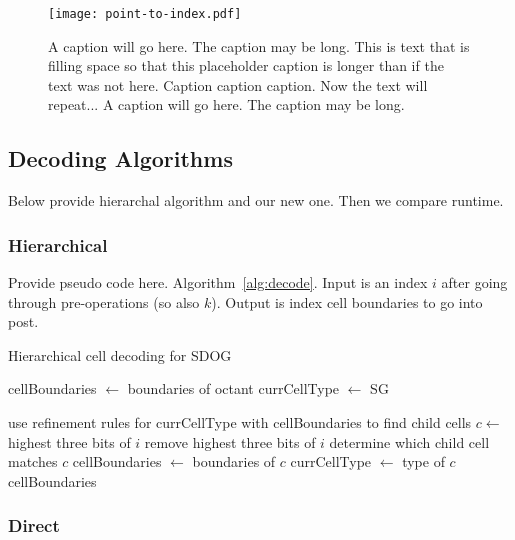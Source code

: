 \begin{figure}[htp!]
	\centering
	\texttt{[image: point-to-index.pdf]}
	\caption[Runtime comparison of SDOG point encoding algorithms]{
		A caption will go here.
		The caption may be long.
		This is text that is filling space so that this placeholder caption is longer than if the text was not here.
		Caption caption caption.
		Now the text will repeat...
		A caption will go here.
		The caption may be long.
	}
	\label{fig:point-to-index}
\end{figure}


\subsection{Decoding Algorithms}
Below provide hierarchal algorithm and our new one.
Then we compare runtime.


\subsubsection{Hierarchical}
Provide pseudo code here.
Algorithm~\ref{alg:decode}. Input is an index $i$ after going through pre-operations (so also $k$). Output is index cell boundaries to go into post.


\begin{algorithm}
	\caption{Hierarchical cell decoding for SDOG}
	
	\begin{algorithmic}
		
		\STATE cellBoundaries $\leftarrow$ boundaries of octant
		\STATE currCellType $\leftarrow$ SG
		
			\STATE use refinement rules for currCellType with cellBoundaries to find child cells
			\STATE $c \leftarrow$ highest three bits of $i$
			\STATE remove highest three bits of $i$
			\STATE determine which child cell matches $c$
			\STATE cellBoundaries $\leftarrow$ boundaries of $c$
			\STATE currCellType $\leftarrow$ type of $c$
		\ENDFOR
		\RETURN cellBoundaries
		
	\end{algorithmic}
	\label{alg:decode}
\end{algorithm}


\subsubsection{Direct}


